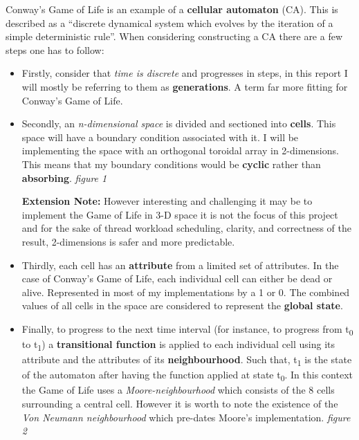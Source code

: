 \documentclass[11pt]{article} %
\begin{document}
Conway's Game of Life is an example of a {\bf cellular automaton} (CA). This is described \cite[Lesser, Wuensche, 1992 p6]{ref6} as a ``discrete dynamical system which evolves by the iteration of a simple deterministic rule''. When considering constructing a CA there are a few steps one has to follow:
\begin{itemize}
\item Firstly, consider that \emph{time is discrete} and progresses in steps, in this report I will mostly be referring to them as {\bf generations}. A term far more fitting for Conway's Game of Life. 
\item Secondly, an \emph{n-dimensional space} is divided and sectioned into {\bf cells}. This space will have a boundary condition associated with it. I will be implementing the space with an orthogonal toroidal array in 2-dimensions. This means that my boundary conditions would be {\bf cyclic} rather than {\bf absorbing}. {\it figure 1}
\begin{mdframed}
{\bf Extension Note:} However interesting and challenging it may be to implement the Game of Life in 3-D space it is not the focus of this project and for the sake of thread workload scheduling, clarity, and correctness of the result, 2-dimensions is safer and more predictable.
\end{mdframed}
\item Thirdly, each cell has an {\bf attribute} from a limited set of attributes. In the case of Conway's Game of Life, each individual cell can either be dead or alive. Represented in most of my implementations by a 1 or 0. The combined values of all cells in the space are considered to represent the {\bf global state}.
\item Finally, to progress to the next time interval (for instance, to progress from t\textsubscript{0} to t\textsubscript{1}) a {\bf transitional function} is applied to each individual cell using its attribute and the attributes of its {\bf neighbourhood}. Such that, t\textsubscript{1} is the state of the automaton after having the function applied at state t\textsubscript{0}. In this context the Game of Life uses a \emph{Moore-neighbourhood} which consists of the 8 cells surrounding a central cell. However it is worth to note the existence of the \emph{Von Neumann neighbourhood} which pre-dates Moore's implementation. {\it figure 2}
\end{itemize}
\end{document}
